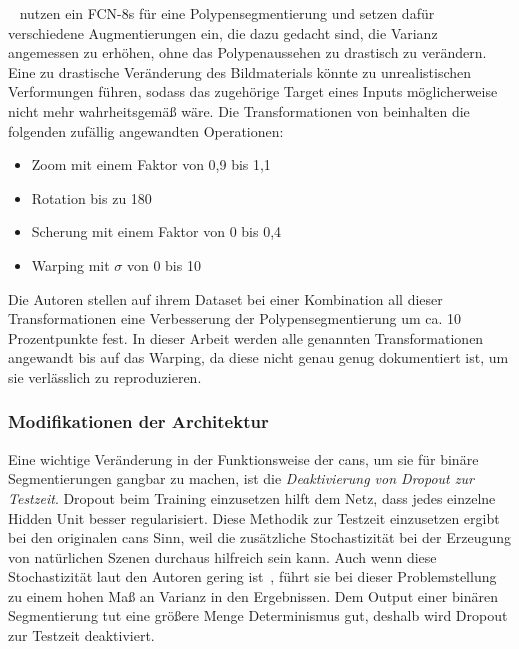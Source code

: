 \citeauthor{Vazquez.2017}~\cite{Vazquez.2017} nutzen ein FCN-8s für eine Polypensegmentierung und setzen dafür verschiedene Augmentierungen ein, die dazu gedacht sind, die Varianz angemessen zu erhöhen, ohne das Polypenaussehen zu drastisch zu verändern.
Eine zu drastische Veränderung des Bildmaterials könnte zu unrealistischen Verformungen führen, sodass das zugehörige Target eines Inputs möglicherweise nicht mehr wahrheitsgemäß wäre.
Die Transformationen von \citeauthor{Vazquez.2017} beinhalten die folgenden zufällig angewandten Operationen:

\begin{itemize}
	\item Zoom mit einem Faktor von 0,9 bis 1,1
	\item Rotation bis zu 180~\textdegree
	\item Scherung mit einem Faktor von 0 bis 0,4
	\item Warping mit $ \sigma $ von 0 bis 10
\end{itemize}

Die Autoren stellen auf ihrem Dataset bei einer Kombination all dieser Transformationen eine Verbesserung der Polypensegmentierung um ca. 10 Prozentpunkte fest.
In dieser Arbeit werden alle genannten Transformationen angewandt bis auf das Warping, da diese nicht genau genug dokumentiert ist, um sie verlässlich zu reproduzieren.



\subsubsection{Modifikationen der Architektur}

Eine wichtige Veränderung in der Funktionsweise der \glspl{can}, um sie für binäre Segmentierungen gangbar zu machen, ist die \emph{Deaktivierung von Dropout zur Testzeit}.
Dropout beim Training einzusetzen hilft dem Netz, dass jedes einzelne Hidden Unit besser regularisiert.
Diese Methodik zur Testzeit einzusetzen ergibt bei den originalen \glspl{can} Sinn, weil die zusätzliche Stochastizität bei der Erzeugung von natürlichen Szenen durchaus hilfreich sein kann.
Auch wenn diese Stochastizität laut den Autoren gering ist~\cite{Isola.2017}, führt sie bei dieser Problemstellung zu einem hohen Maß an Varianz in den Ergebnissen.
Dem Output einer binären Segmentierung tut eine größere Menge Determinismus gut, deshalb wird Dropout zur Testzeit deaktiviert.
